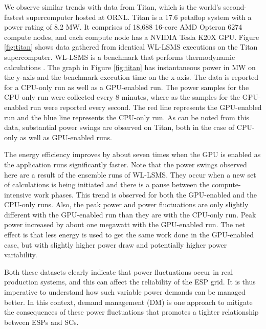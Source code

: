We observe similar trends with data from Titan, which is the world's second-fastest supercomputer hosted at ORNL. Titan is a 17.6 petaflop system with a power rating of 8.2 MW. It comprises of 18,688 16-core AMD Opteron 6274 compute nodes, and each compute node has a NVIDIA Tesla K20X GPU. Figure \ref{fig:titan} shows data gathered from identical WL-LSMS executions on the Titan supercomputer. WL-LSMS is a benchmark that performs thermodynamic calculations  \cite{WLLSMS}. The graph in Figure \ref{fig:titan} has instantaneous power in MW on the y-axis and the benchmark execution time on the x-axis. The data is reported for a CPU-only run as well as a GPU-enabled run. The power samples for the CPU-only run were collected every 8 minutes, where as the samples for the GPU-enabled run were reported every second. The red line represents the GPU-enabled run and the blue line represents the CPU-only run.  As can be noted from this data, substantial power swings are observed on Titan, both in the case of CPU-only as well as GPU-enabled runs. 

The energy efficiency improves by about seven times when the GPU is enabled as the application runs significantly faster. Note that the power swings observed here are a result of the ensemble runs of WL-LSMS. They occur when a new set of calculations is being initiated and there is a pause between the compute-intensive work phases. This trend is observed for both the GPU-enabled and the CPU-only runs. Also, the peak power and power fluctuations are only slightly different with the GPU-enabled run than they are with the CPU-only run. Peak power increased by about one megawatt with the GPU-enabled run. The net effect is that less energy is used to get the same work done in the GPU-enabled case, but with slightly higher power draw and potentially higher power variability.

Both these datasets clearly indicate that power fluctuations occur in real production systems, and this can affect the reliability of the ESP grid. It is thus imperative to understand how such variable power demands can be managed better. In this context, demand management (DM) is one approach to mitigate the consequences of these power fluctuations that promotes a tighter relationship between ESPs and SCs. %

